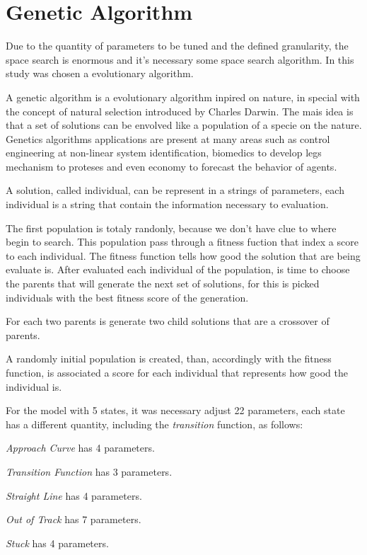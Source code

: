 \section{Genetic Algorithm}

	Due to the quantity of parameters to be tuned and the defined granularity, the space search is enormous and it's necessary some space search algorithm. In this study was chosen a evolutionary algorithm.


	A genetic algorithm is a evolutionary algorithm inpired on nature, in special with the concept of natural selection introduced by Charles
	Darwin. The mais idea is that a set of solutions can be envolved like a population of a specie on the nature. Genetics algorithms applications are present at many areas such as control engineering at non-linear system identification, biomedics to develop legs mechanism to proteses and even economy to forecast the behavior of agents.

	A solution, called individual, can be represent in a strings of parameters, each individual is a string that contain the information necessary to evaluation.

	The first population is totaly randonly, because we don't have clue to where begin to search. This population pass through a fitness fuction that index a score to each individual. The fitness function  tells how good the solution that are being evaluate is. After evaluated each individual of the population, is time to choose the parents that will generate the next set of solutions, for this is picked individuals with the best fitness score of the generation. 


	For each two parents is generate two child solutions that are a crossover of parents.


	A randomly initial population is created, than, accordingly with the fitness function, is associated a score for each individual that represents how good the individual is.	
	
	
	
	For the model with 5 states, it was necessary adjust 22 parameters, each state has a different quantity, including the \emph{transition} function, as follows:

	\emph{Approach Curve} has 4 parameters.

	\emph{Transition Function} has 3 parameters.

	\emph{Straight Line} has 4 parameters.

	\emph{Out of Track} has 7 parameters.

	\emph{Stuck} has 4 parameters.
	
	
	
